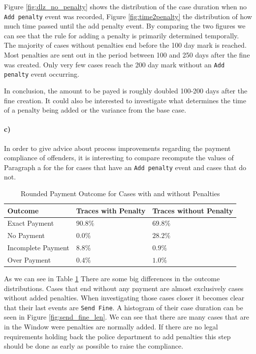 \documentclass[12pt]{report}
\begin{document}
Figure \ref{fig:dlz_no_penalty} shows the distribution of the case duration when no \texttt{Add penalty} event was recorded, Figure \ref{fig:time2penalty} the distribution of how much time passed until the add penalty event. By comparing the two figures we can see that the rule for adding a penalty is primarily determined temporally. The majority of cases without penalties end before the 100 day mark is reached. Most penalties are sent out in the period between 100 and 250 days after the fine was created. Only very few cases reach the 200 day mark without an \texttt{Add penalty} event occurring.

In conclusion, the amount to be payed is roughly doubled 100-200 days after the fine creation. It could also be interested to investigate what determines the time of a penalty being added or the variance from the base case.

\paragraph{\textbf{c)}}
In order to give advice about process improvements regarding the payment compliance of offenders, it is interesting to compare recompute the values of Paragraph a for the for cases that have an
\texttt{Add penalty} event and cases that do not.

\begin{table}[H]
\centering
\begin{tabular}{|l|l|l|}
	\hline \textbf{Outcome} & \textbf{Traces with Penalty} & \textbf{Traces without Penalty} \\
	\hline Exact Payment & $90.8 \%$ & $ 69.8 \%$\\
	\hline No Payment & $0.0 \%$ & $28.2 \%$\\
	\hline Incomplete Payment& $8.8 \%$ & $0.9 \%$\\
	\hline Over Payment & $0.4 \%$ & $1.0 \%$\\
	\hline
\end{tabular}
\caption{Rounded Payment Outcome for Cases with and without Penalties}
\label{tab:3c}
\end{table}

As we can see in Table \ref{tab:3c} There are some big differences in the outcome distributions. Cases that end without any payment are almost exclusively cases without added penalties. When investigating those cases closer it becomes clear that their last events are \texttt{Send Fine}. A histogram of their case duration can be seen in Figure \ref{fig:send_fine_len}. We can see that there are many cases that are in the Window were penalties are normally added. If there are no legal requirements holding back the police department to add penalties this step should be done as early as possible to raise the compliance. \\
\end{document}
